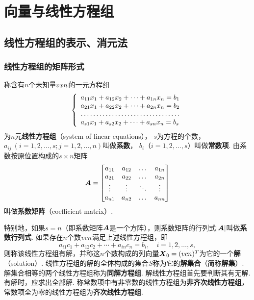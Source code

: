 \chapter{向量与线性方程组}
\section{线性方程组的表示、消元法}
\subsection{线性方程组的矩阵形式}
\begin{definition}
称含有\(n\)个未知量\(v{x}{n}\)的一元方程组\[
\left\{ \begin{array}{l}
a_{11} x_1 + a_{12} x_2 + \dotsb + a_{1n} x_n = b_1 \\
a_{21} x_1 + a_{22} x_2 + \dotsb + a_{2n} x_n = b_2 \\
\hdotsfor{1} \\
a_{s1} x_1 + a_{s2} x_2 + \dotsb + a_{sn} x_n = b_s
\end{array} \right.
\]为\(n\)元\textbf{线性方程组}（system of linear equations），%
\(s\)为方程的个数，%
\(a_{ij}\ (i=1,2,\dotsc,s;j=1,2,\dotsc,n)\)叫做\textbf{系数}，%
\(b_i\)（\(i=1,2,\dotsc,s\)）叫做\textbf{常数项}.
由系数按原位置构成的\(s \times n\)矩阵\[
\boldsymbol{A} = \begin{bmatrix}
a_{11} & a_{12} & \dots & a_{1n} \\
a_{21} & a_{22} & \dots & a_{2n} \\
\vdots & \vdots & \ddots & \vdots \\
a_{n1} & a_{n2} & \dots & a_{nn}
\end{bmatrix}
\]叫做\textbf{系数矩阵}（coefficient matrix）.

特别地，如果\(s = n\)（即系数矩阵\(\boldsymbol{A}\)是一个方阵），则系数矩阵的行列式\(\abs{\boldsymbol{A}}\)叫做\textbf{系数行列式}.
如果存在\(n\)个数\(v{c}{n}\)满足上述线性方程组，即\[
a_{i1}c_1 + a_{12}c_2 + \dotsb + a_{in}c_n = b_i,
\quad
i=1,2,\dotsc,s,
\]则称该线性方程组有解，并称这\(n\)个数构成的列向量\(\boldsymbol{X}_0 = (v{c}{n})^T\)为它的一个\textbf{解}（solution）.
线性方程组的解的全体构成的集合\(S\)称为它的\textbf{解集合}（简称\textbf{解集}）.
解集合相等的两个线性方程组称为\textbf{同解方程组}.
解线性方程组首先要判断其有无解.有解时，应求出全部解.
称常数项中有非零数的线性方程组为\textbf{非齐次线性方程组}，常数项全为零的线性方程组为\textbf{齐次线性方程组}.


\end{definition}
